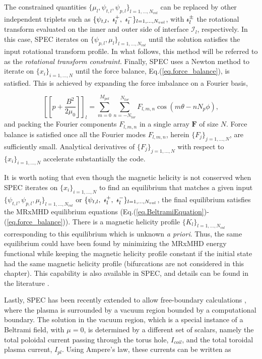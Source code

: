 The constrained quantities $\{\mu_l,\psi_{t,l},\psi_{p,l}\}_{l=1,\ldots,N_{vol}}$ can be replaced by other independent triplets such as $\{\psi_{t,l},\ \iotabar_l^+,\  \iotabar_l^-\}_{l=1,\ldots,N_{vol}}$, with $\text{$\iota\!\!$-}_l^\pm$ the rotational transform evaluated on the inner and outer side of interface $\mathcal{I}_l$, respectively. In this case, \ac{SPEC} iterates on $\{\psi_{p,l}, \mu_l\}_{l=1,\ldots,N_{vol}}$ until the solution satisfies the input rotational transform profile. In what follows, this method will be referred to as the \emph{rotational transform constraint}. Finally, \ac{SPEC} uses a Newton method to iterate on $\{x_i\}_{i=1,\ldots,N}$ until the force balance, Eq.(\ref{eq.force_balance}), is satisfied. This is achieved by expanding the force imbalance on a Fourier basis,
 
 \begin{equation}
     \left[\left[p+\frac{B^2}{2\mu_0}\right]\right]_l = \sum_{m=0}^{M_{pol}}\sum_{n=-N_{tor}}^{N_{tor}} F_{l,m,n} \cos(m\theta-nN_p\phi),
 \end{equation}
 and packing the Fourier components $F_{l,m,n}$ in a single array $\mathbf{F}$ of size $N$. Force balance is satisfied once all the Fourier modes $F_{l,m,n}$, herein $\{F_j\}_{j=1,\ldots,N}$, are sufficiently small. Analytical derivatives of $\{F_j\}_{j=1,\ldots,N}$ with respect to $\{x_i\}_{i=1,\ldots,N}$ accelerate substantially the code.
 
 It is worth noting that even though the magnetic helicity is not conserved when \ac{SPEC} iterates on $\{x_i\}_{i=1,\ldots,N}$ to find an equilibrium that matches a given input $\{\psi_{t,l}, \psi_{p,l}, \mu_l\}_{l=1,\ldots,N_{vol}}$ or $\{\psi_{t,l},\ \iotabar_l^+,\  \iotabar_l^-\}_{l=1,\ldots,N_{vol}}$, the final equilibrium satisfies the \ac{MRxMHD} equilibrium equations (Eq.(\ref{eq.BeltramiEquation})-(\ref{eq.force_balance})). There is a magnetic helicity profile $\{K_l\}_{l=1,\ldots,N_{vol}}$ corresponding to this equilibrium which is unknown \textit{a priori}. Thus, the same equilibrium could have been found by minimizing the \ac{MRxMHD} energy functional while keeping the magnetic helicity profile constant if the initial state had the same magnetic helicity profile (bifurcations are not considered in this chapter). This capability is also available in \ac{SPEC}, and details can be found in the literature \citep{Hudson2012,Dennis2013a}.

 Lastly, \ac{SPEC} has been recently extended to allow free-boundary calculations \citep{Hudson2020c}, where the plasma is surrounded by a vacuum region bounded by a computational boundary. The solution in the vacuum region, which is a special instance of a Beltrami field, with $\mu=0$, is determined by a different set of scalars, namely the total poloidal current passing through the torus hole, $I_{coil}$, and the total toroidal plasma current, $I_{pl}$. Using Ampere's law, these currents can be written as
 
